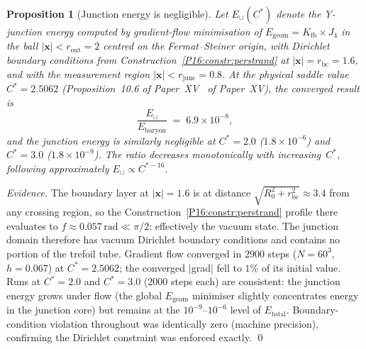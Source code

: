\documentclass[11pt,a4paper]{article}
\newtheorem{proposition}[theorem]{Proposition}
\theoremstyle{definition}\newtheorem{definition}[theorem]{Definition}
\theoremstyle{remark}
\theoremstyle{definition}\newtheorem{construction}[theorem]{Construction}
\newcommand{\Kfb}{K_{\mathrm{fb}}}
\begin{document}
\begin{proposition}[Junction energy is negligible]
\label{P16:prop:ejunc_zero}
Let $E_\cup(C^*)$ denote the Y-junction energy computed by gradient-flow
minimisation of $E_{\mathrm{geom}}=\Kfb\times J_4$ in the ball
$|\mathbf{x}|<r_{\mathrm{out}}=2$ centred on the Fermat--Steiner origin,
with Dirichlet boundary conditions from Construction~\ref{P16:constr:perstrand} at
$|\mathbf{x}|=r_{\mathrm{bc}}=1.6$, and with the measurement region
$|\mathbf{x}|<r_{\mathrm{junc}}=0.8$.  At the physical saddle value
$C^*=2.5062$ (Proposition~10.6 of Paper~XV~\cite{Paper15} of Paper~XV), the
converged result is
\begin{equation}
  \frac{E_\cup}{E_{\mathrm{baryon}}}
  \;=\; 6.9\times10^{-8},
  \label{P16:eq:ejunc_ratio}
\end{equation}
and the junction energy is similarly negligible at $C^*=2.0$ ($1.8\times10^{-6}$)
and $C^*=3.0$ ($1.8\times10^{-9}$).  The ratio decreases monotonically with
increasing~$C^*$, following approximately $E_\cup\propto C^{*-16}$.
\end{proposition}

\begin{proof}[Evidence]
The boundary layer at $|\mathbf{x}|=1.6$ is at distance $\sqrt{R_0^2+r_{\mathrm{bc}}^2}\approx3.4$
from any crossing region, so the Construction~\ref{P16:constr:perstrand} profile there evaluates to
$f\approx0.057\,\mathrm{rad}\ll\pi/2$: effectively the vacuum state.
The junction domain therefore has vacuum Dirichlet boundary conditions and
contains no portion of the trefoil tube.  Gradient flow converged in 2900 steps
($N=60^3$, $h=0.067$) at $C^*=2.5062$; the converged $|$grad$|$ fell to
$1\%$ of its initial value.  Runs at $C^*=2.0$ and $C^*=3.0$ (2000 steps
each) are consistent: the junction energy grows under flow (the global
$E_{\mathrm{geom}}$ minimiser slightly concentrates energy in the
junction core) but remains at the $10^{-9}$--$10^{-6}$ level of
$E_{\mathrm{total}}$.  Boundary-condition violation throughout was
identically zero (machine precision), confirming the Dirichlet
constraint was enforced exactly.
\qed
\end{proof}
\end{document}
